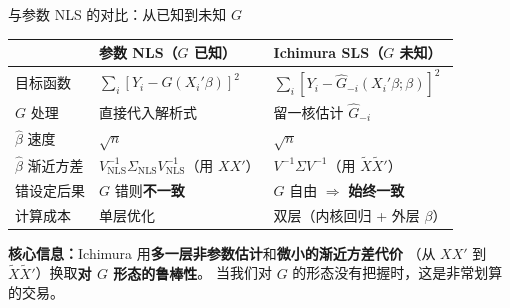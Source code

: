 \documentclass[aspectratio=169, 10pt]{beamer}
\begin{document}
\begin{frame}{与参数 NLS 的对比：从已知到未知 $G$}

  \begin{center}\footnotesize
  \begin{tabular}{p{3cm}|p{5.5cm}|p{5.5cm}}
  \hline
  & \textbf{参数 NLS}（$G$ 已知） & \textbf{Ichimura SLS}（$G$ 未知） \\
  \hline
  目标函数 & $\sum_i [Y_i - G(X_i'\beta)]^2$ & $\sum_i [Y_i - \hat G_{-i}(X_i'\beta; \beta)]^2$ \\
  \hline
  $G$ 处理 & 直接代入解析式 & 留一核估计 $\hat G_{-i}$ \\
  \hline
  $\hat\beta$ 速度 & $\sqrt{n}$ & $\sqrt{n}$ \\
  \hline
  $\hat\beta$ 渐近方差 & $V_{\text{NLS}}^{-1}\Sigma_{\text{NLS}} V_{\text{NLS}}^{-1}$（用 $X X'$）& $V^{-1}\Sigma V^{-1}$（用 $\tilde X \tilde X'$）\\
  \hline
  错设定后果 & $G$ 错则\textbf{不一致} & $G$ 自由 $\Rightarrow$ \textbf{始终一致} \\
  \hline
  计算成本 & 单层优化 & 双层（内核回归 + 外层 $\beta$）\\
  \hline
  \end{tabular}
  \end{center}

  \begin{keybox}
    \textbf{核心信息：}Ichimura 用\textbf{多一层非参数估计}和\textbf{微小的渐近方差代价}
    （从 $X X'$ 到 $\tilde X \tilde X'$）换取\textbf{对 $G$ 形态的鲁棒性}。
    当我们对 $G$ 的形态没有把握时，这是非常划算的交易。
  \end{keybox}

\end{frame}
\end{document}

